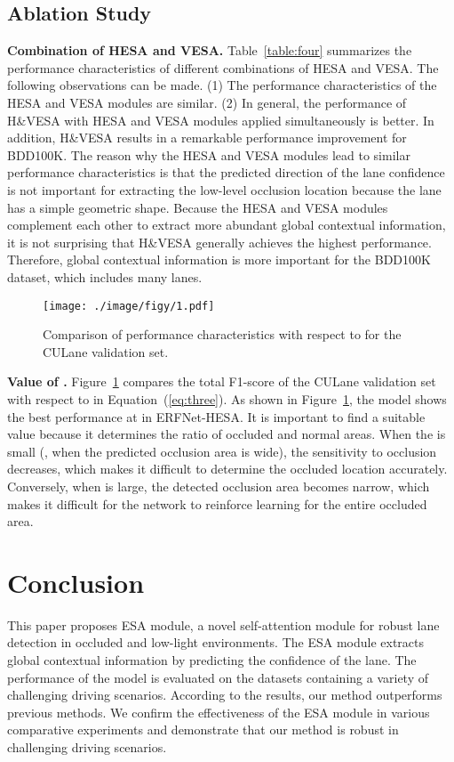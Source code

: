 \documentclass[10pt,twocolumn,letterpaper]{article}
\begin{document}
\subsection{Ablation Study}
\label{ablation}

\noindent
\textbf{Combination of HESA and VESA.} Table~\ref{table:four} summarizes the performance characteristics of different combinations of HESA and VESA. The following observations can be made. (1) The performance characteristics of the HESA and VESA modules are similar. (2) In general, the performance of H\&VESA with HESA and VESA modules applied simultaneously is better. In addition, H\&VESA results in a remarkable performance improvement for BDD100K. The reason why the HESA and VESA modules lead to similar performance characteristics is that the predicted direction of the lane confidence is not important for extracting the low-level occlusion location because the lane has a simple geometric shape. Because the HESA and VESA modules complement each other to extract more abundant global contextual information, it is not surprising that H\&VESA generally achieves the highest performance. Therefore, global contextual information is more important for the BDD100K dataset, which includes many lanes.

\begin{figure}
	\setlength{\belowcaptionskip}{-24pt}
	\begin{center}
		\texttt{[image: ./image/figy/1.pdf]}
		\vspace{-3ex}
		\caption{Comparison of performance characteristics with respect to  for the CULane validation set.}
		\label{fig:graph}
	\end{center}
\end{figure}

\noindent
\textbf{Value of .} Figure~\ref{fig:graph} compares the total F1-score of the CULane validation set with respect to  in Equation~(\ref{eq:three}). As shown in Figure~\ref{fig:graph}, the model shows the best performance at  in ERFNet-HESA. It is important to find a suitable  value because it determines the ratio of occluded and normal areas. When the  is small (\ie, when the predicted occlusion area is wide), the sensitivity to occlusion decreases, which makes it difficult to determine the occluded location accurately. Conversely, when  is large, the detected occlusion area becomes narrow, which makes it difficult for the network to reinforce learning for the entire occluded area.

\section{Conclusion}
This paper proposes ESA module, a novel self-attention module for robust lane detection in occluded and low-light environments. The ESA module extracts global contextual information by predicting the confidence of the lane. The performance of the model is evaluated on the datasets containing a variety of challenging driving scenarios. According to the results, our method outperforms previous methods. We confirm the effectiveness of the ESA module in various comparative experiments and demonstrate that our method is robust in challenging driving scenarios.
\end{document}
